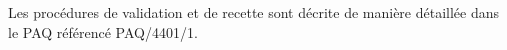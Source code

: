 Les procédures de validation et de recette sont décrite de manière détaillée dans le PAQ référencé PAQ/4401/1.